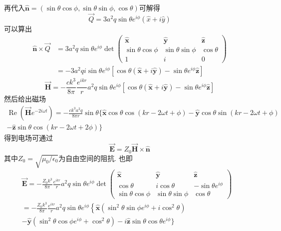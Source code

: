 \documentclass[UTF8,9pt]{ctexart}
\begin{document}
再代入$\hat{\boldsymbol{n}}=(\sin \theta \cos \phi, \sin \theta \sin \phi, \cos \theta)$可解得
\begin{equation}
\vec{Q}=3 a^{2} q \sin \theta e^{i \phi}(\hat{x}+i \hat{y})
\end{equation}
 可以算出$$ 
\begin{aligned} \hat{\boldsymbol{n}} \times \overrightarrow{Q} &=3 a^{2} q \sin \theta e^{i \phi} \operatorname{det} \left( \begin{array}{ccc}{\hat{\boldsymbol{x}}} & {\hat{\boldsymbol{y}}} & {\hat{\boldsymbol{z}}} \\ {\sin \theta \cos \phi} & {\sin \theta \sin \phi} & {\cos \theta} \\ {1} & {i} & {0}\end{array}\right) \\ &=-3 a^{2} q i \sin \theta e^{i \phi}\left[\cos \theta(\hat{\boldsymbol{x}}+i \hat{\boldsymbol{y}})-\sin \theta e^{i \phi} \hat{\boldsymbol{z}}\right] \end{aligned}
 $$
 $$ 
\overrightarrow{\boldsymbol{H}}=-\frac{c k^{3}}{8 \pi} \frac{e^{i k r}}{r} a^{2} q \sin \theta e^{i \phi}\left[\cos \theta(\hat{\boldsymbol{x}}+i \hat{\boldsymbol{y}})-\sin \theta e^{i \phi} \hat{\boldsymbol{z}}\right]
 $$然后给出磁场$$ 
\begin{array}{c}{\operatorname{Re}\left(\overrightarrow{\boldsymbol{H}} e^{-2 i \omega t}\right)=-\frac{c k^{3} a^{2} q}{8 \pi r} \sin \theta\{\hat{\boldsymbol{x}} \cos \theta \cos (k r-2 \omega t+\phi)-\hat{\boldsymbol{y}} \cos \theta \sin (k r-2 \omega t+\phi)} \\ {-\hat{\boldsymbol{z}} \sin \theta \cos (k r-2 \omega t+2 \phi) \}}\end{array}
 $$得到电场可通过$$ 
 \overrightarrow{\boldsymbol{E}}=Z_{0} \overrightarrow{\boldsymbol{H}} \times \hat{\boldsymbol{n}}
  $$其中$Z_{0}=\sqrt{\mu_{0} / \epsilon_{0}}$为自由空间的阻抗. 也即
  $$ 
\begin{aligned}
 \overrightarrow{\boldsymbol{E}}=-\frac{Z_{0} k^{3}}{8 \pi} \frac{e^{i k r}}{r} a^{2} q \sin \theta e^{i \phi} \operatorname{det} \left( \begin{array}{ccc}{\hat{\boldsymbol{x}}} & {\hat{\boldsymbol{y}}} & {\hat{\boldsymbol{z}}} \\ 
{\cos \theta} & {i \cos \theta} & {-\sin \theta e^{i \phi}} \\ 
{\sin \theta \cos \phi} & {\sin \theta \sin \phi} & {\cos \theta}\end{array}\right) \\
=-\frac{Z_{0} k^{3}}{8 \pi} \frac{e^{i k r}}{r} a^{2} q \sin \theta e^{i \phi}\left\{\hat{\boldsymbol{x}}\left(\sin ^{2} \theta \sin \phi e^{i \phi}+i \cos ^{2} \theta\right)\right.& \\
-\hat{\boldsymbol{y}}\left(\sin ^{2} \theta \cos \phi e^{i \phi}+\cos ^{2} \theta\right)-i \hat{\boldsymbol{z}} \sin \theta \cos \theta e^{i \phi} \} \end{aligned}
 $$
\end{document}
